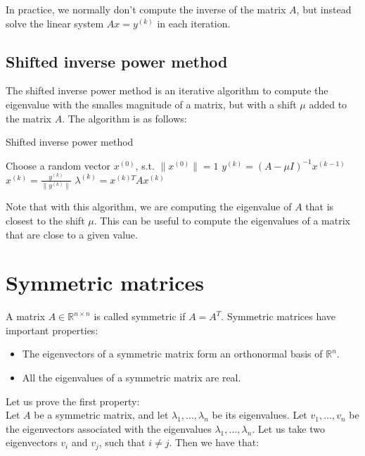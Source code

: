 In practice, we normally don't compute the inverse of the matrix $A$, but instead solve the linear system $A x = y^{(k)}$ in each
iteration.

\subsection{Shifted inverse power method}

The shifted inverse power method is an iterative algorithm to compute the eigenvalue with the smalles magnitude of a matrix, but
with a shift $\mu$ added to the matrix $A$. The algorithm is as follows:

\begin{algorithm}[H]
    \caption{Shifted inverse power method}
    \begin{algorithmic}[1]
        \State Choose a random vector $x^{(0)}$, s.t. $\|x^{(0)}\| = 1$
            \State $y^{(k)} = (A - \mu I)^{-1} x^{(k-1)}$
            \State $x^{(k)} = \frac{y^{(k)}}{\|y^{(k)}\|}$
            \State $\lambda^{(k)} = x^{(k)T} A x^{(k)}$
        \EndFor
    \end{algorithmic}
\end{algorithm}

Note that with this algorithm, we are computing the eigenvalue of $A$ that is closest to the shift $\mu$. This can be useful
to compute the eigenvalues of a matrix that are close to a given value.

\section{Symmetric matrices}

A matrix $A \in \mathbb{R}^{n \times n}$ is called symmetric if $A = A^T$. Symmetric matrices have important properties:

\begin{itemize}
    \item The eigenvectors of a symmetric matrix form an orthonormal basis of $\mathbb{R}^n$.
    \item All the eigenvalues of a symmetric matrix are real.
\end{itemize}

Let us prove the first property:\\

Let $A$ be a symmetric matrix, and let $\lambda_1, \ldots, \lambda_n$ be its eigenvalues. Let $v_1, \ldots, v_n$ be the eigenvectors
associated with the eigenvalues $\lambda_1, \ldots, \lambda_n$. Let us take two eigenvectors $v_i$ and $v_j$, such that $i \neq j$.
Then we have that:

